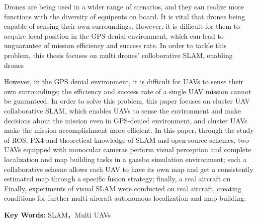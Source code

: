 Drones are being used in a wider range of scenarios, 
and they can realize more functions with the diversity of equipents on board.
It is vital that drones being capable of sensing their own surroundings. 
However, it is difficult for them to acquire local position in the GPS-denial environment, which can lead to unguarantee of mission efficiency and success rate. 
In order to tackle this problem, this thesis focuses on multi drones' colloborative SLAM, enabling drones 

However, in the GPS denial environment, it is difficult for UAVs to sense their own surroundings; the efficiency and success rate of a single UAV mission cannot be guaranteed.
In order to solve this problem, this paper focuses on cluster UAV collaborative SLAM, which enables UAVs to sense the environment and make decisions about the mission even in GPS-denied environment, and cluster UAVs make the mission accomplishment more efficient.
In this paper, through the study of ROS, PX4 and theoretical knowledge of SLAM and open-source schemes, two UAVs equipped with monocular cameras perform visual perception and complete localization and map building tasks in a gazebo simulation environment; such a collaborative scheme allows each UAV to have its own map and get a consistently estimated map through a specific fusion strategy; finally, a real aircraft on Finally, experiments of visual SLAM were conducted on real aircraft, creating conditions for further multi-aircraft autonomous localization and map building.


\vspace{0.1in}
\noindent \textbf{Key Words:} SLAM，Multi UAVs
